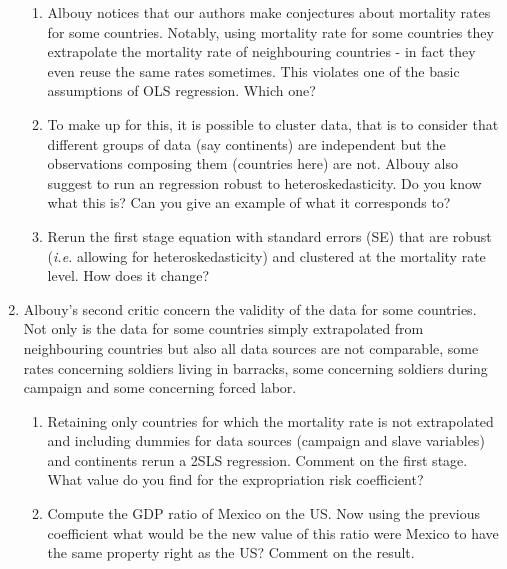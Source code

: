 \documentclass[11pt, a4paper]{article} %
\begin{document}
\begin{enumerate}
    \begin{enumerate}
        \item Albouy notices that our authors make conjectures about mortality rates for some countries. Notably, using mortality rate for some countries they extrapolate the mortality rate of neighbouring countries - in fact they even reuse the same rates sometimes. This violates one of the basic assumptions of OLS regression. Which one?   
        \item To make up for this, it is possible to cluster data, that is to consider that different groups of data (say continents) are independent but the observations composing them (countries here) are not. Albouy also suggest to run an regression robust to heteroskedasticity. Do you know what this is? Can you give an example of what it corresponds to? 
        \item Rerun the first stage equation with standard errors (SE) that are robust (\textit{i.e.} allowing for heteroskedasticity) and clustered at the mortality rate level. How does it change? 
    \end{enumerate}
    \item Albouy's second critic concern the validity of the data for some countries. Not only is the data for some countries simply extrapolated from neighbouring countries but also all data sources are not comparable, some rates concerning soldiers living in barracks, some concerning soldiers during campaign and some concerning forced labor. 
    \begin{enumerate}
        \item Retaining only countries for which the mortality rate is not extrapolated and including dummies for data sources (campaign and slave variables) and continents rerun a 2SLS regression. Comment on the first stage. What value do you find for the expropriation risk coefficient? 
        \item Compute the GDP ratio of Mexico on the US. Now using the previous coefficient what would be the new value of this ratio were Mexico to have the same property right  as the US? Comment on the result.
    \end{enumerate}
\end{enumerate}




\end{document}
